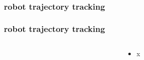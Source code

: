 \documentclass{beamer}
\begin{document}
\begin{frame}
  
  \frametitle{\textbf { robot trajectory tracking }}

\end{frame}


\begin{frame}
  
  \frametitle{\textbf { robot trajectory tracking}}
 
  \begin{columns}

    \begin{column}{0.5\textwidth}
    \end{column}

    \begin{column}{0.5\textwidth}
      \begin{itemize}
        \item x
      \end{itemize}
    \end{column}

  \end{columns}

\end{frame}
\end{document}
